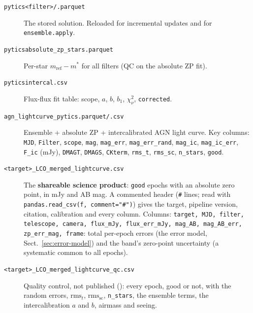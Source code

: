 \documentclass[12pt,a4paper]{article}
\begin{document}
\begin{description}
  \item[\texttt{pytics\/\hspace{0pt}<filter>/.parquet}]
    The stored solution.  Reloaded for incremental updates and for
    \texttt{ensemble.apply}.
  \item[\texttt{pytics\/\hspace{0pt}absolute\_\hspace{0pt}zp\_\hspace{0pt}stars.parquet}]
    Per-star $m_\mathrm{ref} - m^*$ for all filters (QC on the absolute ZP fit).
  \item[\texttt{pytics\/\hspace{0pt}intercal.csv}]
    Flux-flux fit table: scope, $a$, $b$, $b_1$, $\chi^2_\nu$, \texttt{corrected}.
  \item[\texttt{agn\_\hspace{0pt}lightcurve\_\hspace{0pt}pytics.parquet/\hspace{0pt}.csv}]
    Ensemble + absolute ZP + intercalibrated AGN light curve.
    Key columns: \texttt{MJD}, \texttt{Filter}, \texttt{scope}, \texttt{mag},
    \texttt{mag\_err}, \texttt{mag\_err\_rand}, \texttt{mag\_ic}, \texttt{mag\_ic\_err},
    \texttt{F\_ic} (mJy), \texttt{DMAGT}, \texttt{DMAGS}, \texttt{CKterm},
    \texttt{rms\_t}, \texttt{rms\_sc}, \texttt{n\_stars}, \texttt{good}.
  \item[\texttt{<target>\_\hspace{0pt}LCO\_\hspace{0pt}merged\_\hspace{0pt}lightcurve.csv}]
    The \textbf{shareable science product}: \texttt{good} epochs with an absolute zero point, in mJy and
    AB mag.  A commented header (\texttt{\#} lines; read with \texttt{pandas.read\_csv(f, comment="\#")})
    gives the target, pipeline version, citation, calibration and every column.  Columns:
    \texttt{target, MJD, filter, telescope, camera, flux\_mJy, flux\_err\_mJy, mag\_AB, mag\_AB\_err,
    zp\_err\_mag, frame}: total per-epoch errors (the error model, Sect.~\ref{sec:error-model}) and the
    band's zero-point uncertainty (a systematic common to all epochs).
  \item[\texttt{<target>\_\hspace{0pt}LCO\_\hspace{0pt}merged\_\hspace{0pt}lightcurve\_\hspace{0pt}qc.csv}]
    Quality control, not published (): every epoch, good or not, with the
    random errors, $\mathrm{rms}_t$, $\mathrm{rms}_\mathrm{sc}$, \texttt{n\_stars}, the ensemble terms,
    the intercalibration $a$ and $b$, airmass and seeing.
\end{description}
\end{document}
